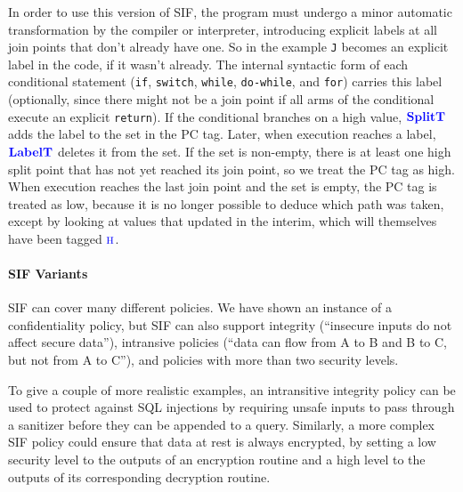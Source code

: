 \documentclass{llncs}
\begin{document}
In order to use this version of SIF, the program must undergo a minor automatic transformation
by the compiler or interpreter, introducing
explicit labels at all join points that don't already have one. 
So in the example {\tt J} becomes an explicit label in the code, if it wasn't already. 
The internal syntactic form of each conditional statement
({\tt if}, {\tt switch}, {\tt while}, {\tt do-while}, and {\tt for})
carries this label (optionally, since there might not be a join point if all arms of the
conditional execute an explicit {\tt return}).
If the conditional branches on a high value, \(\color{blue} \mathbf{SplitT}\) adds the label to the set
in the PC tag. Later, when execution reaches a label, \(\color{blue} \mathbf{LabelT}\) deletes it from the
set. If the set is non-empty, there is at least one high split point that has not
yet reached its join point, so we treat the PC tag as high. When execution reaches the
last join point and the set is empty, the PC tag is treated as low, because it is no longer possible to deduce which
path was taken, except by looking at values that updated in the interim, which
will themselves have been tagged \(\textnormal{\color{blue} \sc h}\). 

\paragraph*{SIF Variants}

SIF can cover many different policies. We have shown an instance of
a confidentiality policy, but SIF can also support integrity
(``insecure inputs do not affect secure data''), intransive policies
(``data can flow from A to B and B to C, but not from A to C''), and policies with
more than two security levels.

To give a couple of more realistic examples, an intransitive integrity policy
can be used to protect against SQL injections by requiring unsafe inputs to pass through a sanitizer
before they can be appended to a query. Similarly, a more complex SIF policy could ensure that
data at rest is always encrypted, by setting a low security level to the outputs of an encryption
routine and a high level to the outputs of its corresponding decryption routine.

\end{document}

